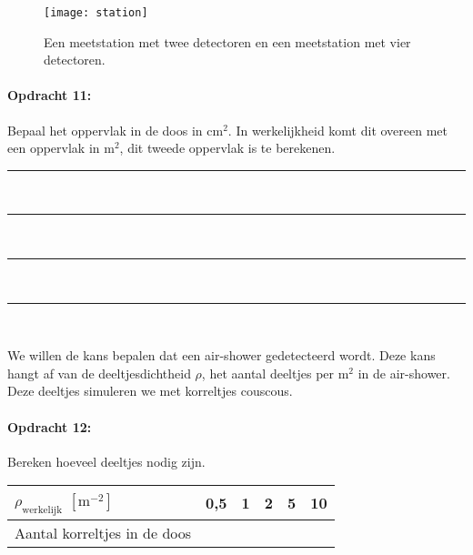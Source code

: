 \begin{figure}[p]
    \centering
    \texttt{[image: station]}
    \caption{Een meetstation met twee detectoren en een
    meetstation met vier detectoren.}
    \label{fig:Meetstations}
\end{figure}

\begin{minipage}[t]{\columnwidth}%

\paragraph{Opdracht 11:}

Bepaal het oppervlak in de doos in $\mathrm{cm^{2}}$. In
werkelijkheid komt dit overeen met een oppervlak in $\mathrm{m^{2}}$,
dit tweede oppervlak is te berekenen.

\begin{center}
    \rule{\textwidth}{0.3mm}\\
    \rule{\textwidth}{0.3mm}\\
    \rule{\textwidth}{0.3mm}\\
    \rule{\textwidth}{0.3mm}\\
\end{center}
\end{minipage}\bigskip{}

We willen de kans bepalen dat een air-shower gedetecteerd wordt. Deze
kans hangt af van de deeltjesdichtheid $\rho$, het aantal deeltjes
per $\mathrm{m^{2}}$ in de air-shower. Deze deeltjes simuleren we
met korreltjes couscous.

\begin{minipage}[t]{1\columnwidth}%

\paragraph{Opdracht 12:}

Bereken hoeveel deeltjes nodig zijn.

\bigskip{}

\begin{tabular}{|x{.3\textwidth}|x{.1\textwidth}|x{.1\textwidth}
                |x{.1\textwidth}|x{.1\textwidth}|x{.1\textwidth}|}
    \hline 
    $\rho_\textrm{werkelijk}$ $\left[\mathrm{m^{-2}}\right]$ & 0,5 & 1 & 2 & 5 & 10 \\
    \hline 
    Aantal korreltjes in de doos &  &  &  &  & \\
    \hline 
    \end{tabular}%
\end{minipage}

